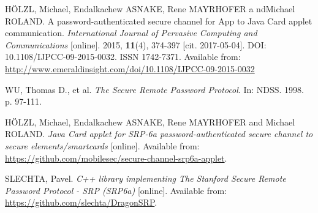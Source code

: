 \documentclass[12pt,a4paper]{article}
\begin{document}
\begin{thebibliography}{9}
HÖLZL, Michael, Endalkachew ASNAKE, Rene MAYRHOFER a ndMichael ROLAND. A password-authenticated secure channel for App to Java Card applet communication. \textit{International Journal of Pervasive Computing and Communications} [online]. 2015, \textbf{11}(4), 374-397 [cit. 2017-05-04]. DOI: 10.1108/IJPCC-09-2015-0032. ISSN 1742-7371. Available from: \url{http://www.emeraldinsight.com/doi/10.1108/IJPCC-09-2015-0032}

WU, Thomas D., et al. \textit{The Secure Remote Password Protocol}. In: NDSS. 1998. p. 97-111.

HÖLZL, Michael, Endalkachew ASNAKE, Rene MAYRHOFER and Michael ROLAND. \textit{Java Card applet for SRP-6a password-authenticated secure channel to secure elements/smartcards} [online]. Available from: \url{https://github.com/mobilesec/secure-channel-srp6a-applet}.

SLECHTA, Pavel. \textit{C++ library implementing The Stanford Secure Remote Password Protocol - SRP (SRP6a)} [online]. Available from: \url{https://github.com/slechta/DragonSRP}.
\end{thebibliography}





 
\end{document}
